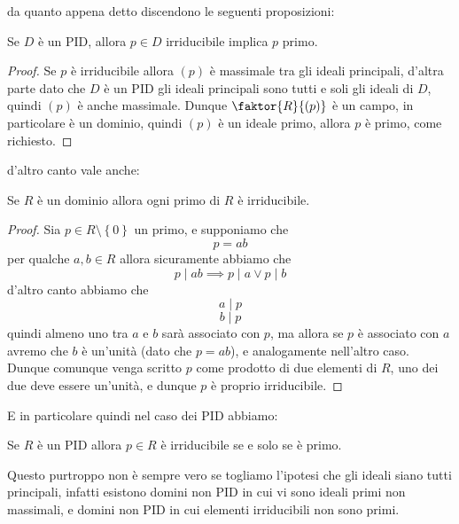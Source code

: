 \documentclass[11pt]{scrartcl}
\begin{document}
	da quanto appena detto discendono le seguenti proposizioni:
	\begin{proposition}
		Se $D$ è un PID, allora $p\in D$ irriducibile implica $p$ primo.
	\end{proposition}
	\begin{proof}
		Se $p$ è irriducibile allora $(p)$ è massimale tra gli ideali principali, d'altra parte dato che $D$ è un PID gli ideali principali sono tutti e soli gli ideali di $D$, quindi $(p)$ è anche massimale. Dunque $\faktor{R}{(p)}$ è un campo, in particolare è un dominio, quindi $(p)$ è un ideale primo, allora $p$ è primo, come richiesto.
	\end{proof}
	d'altro canto vale anche:
	\begin{proposition}
		Se $R$ è un dominio allora ogni primo di $R$ è irriducibile.
	\end{proposition}
	\begin{proof}
		Sia $p\in R\setminus \left\{0\right\}$ un primo, e supponiamo che
		$$p=ab$$
		per qualche $a,b\in R$ allora sicuramente abbiamo che
		$$p\mid ab \implies p\mid a \lor p\mid b$$
		d'altro canto abbiamo che 
		$$a\mid p$$
		$$b\mid p$$
		quindi almeno uno tra $a$ e $b$ sarà associato con $p$, ma allora se $p$ è associato con $a$ avremo che $b$ è un'unità (dato che $p=ab$), e analogamente nell'altro caso. Dunque comunque venga scritto $p$ come prodotto di due elementi di $R$, uno dei due deve essere un'unità, e dunque $p$ è proprio irriducibile.
	\end{proof}
	E in particolare quindi nel caso dei PID abbiamo:
	\begin{corollary}\label{primo equivale a irriducibile in un pid}
		Se $R$ è un PID allora $p\in R$ è irriducibile se e solo se è primo.
	\end{corollary}
	Questo purtroppo non è sempre vero se togliamo l'ipotesi che gli ideali siano tutti principali, infatti esistono domini non PID in cui vi sono ideali primi non massimali, e domini non PID in cui elementi irriducibili non sono primi. 
\end{document}
